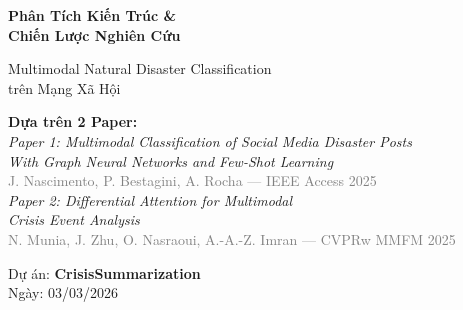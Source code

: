 \documentclass[12pt,a4paper]{article}
\begin{document}
\begin{titlepage}
\begin{center}
\vspace*{1cm}


\vspace{1.5cm}
{\Huge\bfseries\color{primary} Phân Tích Kiến Trúc \&\\[0.3cm] Chiến Lược Nghiên Cứu}

\vspace{0.8cm}
{\Large\color{secondary} Multimodal Natural Disaster Classification\\trên Mạng Xã Hội}

\vspace{1.2cm}

\vspace{1.2cm}
{\large\color{primary}\textbf{Dựa trên 2 Paper:}}\\[0.5cm]
{\normalsize
\textit{Paper 1: Multimodal Classification of Social Media Disaster Posts\\With Graph Neural Networks and Few-Shot Learning}\\
\textcolor{gray}{J. Nascimento, P. Bestagini, A. Rocha — IEEE Access 2025}\\[0.4cm]
\textit{Paper 2: Differential Attention for Multimodal\\Crisis Event Analysis}\\
\textcolor{gray}{N. Munia, J. Zhu, O. Nasraoui, A.-A.-Z. Imran — CVPRw MMFM 2025}
}

\vspace{1.5cm}
{\large Dự án: \textbf{CrisisSummarization}}\\[0.3cm]
{\normalsize Ngày: 03/03/2026}

\vfill
{}
\end{center}
\end{titlepage}

\tableofcontents
\newpage

\end{document}
